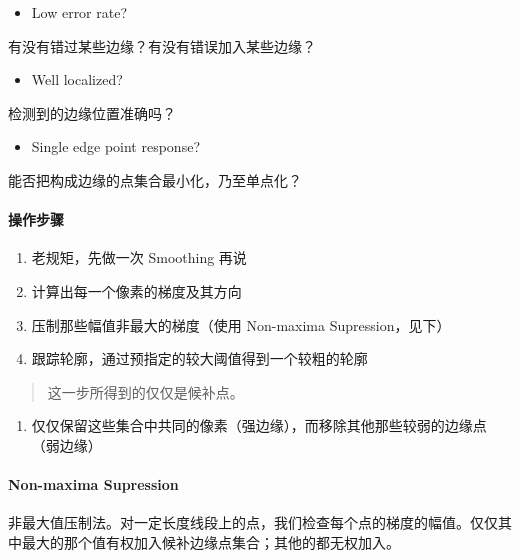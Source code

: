 \documentclass[
]{article}
\begin{document}
\begin{itemize}
\item
  Low error rate?
\end{itemize}

有没有错过某些边缘？有没有错误加入某些边缘？

\begin{itemize}
\item
  Well localized?
\end{itemize}

检测到的边缘位置准确吗？

\begin{itemize}
\item
  Single edge point response?
\end{itemize}

能否把构成边缘的点集合最小化，乃至单点化？

\hypertarget{header-n125}{%
\paragraph{操作步骤}\label{header-n125}}

\begin{enumerate}
\def\labelenumi{\arabic{enumi}.}
\item
  老规矩，先做一次 Smoothing 再说
\item
  计算出每一个像素的梯度及其方向
\item
  压制那些幅值非最大的梯度（使用 Non-maxima Supression，见下）
\item
  跟踪轮廓，通过预指定的较大阈值得到一个较粗的轮廓
\end{enumerate}

\begin{quote}
这一步所得到的仅仅是候补点。
\end{quote}

\begin{enumerate}
\def\labelenumi{\arabic{enumi}.}
\item
  仅仅保留这些集合中共同的像素（强边缘），而移除其他那些较弱的边缘点（弱边缘）
\end{enumerate}

\hypertarget{header-n140}{%
\paragraph{Non-maxima Supression}\label{header-n140}}

非最大值压制法。对一定长度线段上的点，我们检查每个点的梯度的幅值。仅仅其中最大的那个值有权加入候补边缘点集合；其他的都无权加入。
\end{document}
